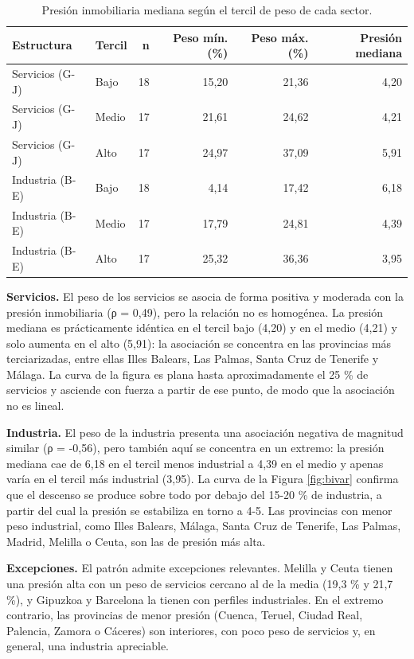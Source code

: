 \documentclass[econometrics,article,submit,moreauthors,pdftex]{Definitions/mdpi}
\begin{document}
\begin{table}[H]
\centering
\caption{\label{tab:tabterciles}Presión inmobiliaria mediana según el tercil de peso de cada sector.}
\centering
\fontsize{8}{10}\selectfont
\begin{tabular}[t]{llrrrr}
\toprule
Estructura & Tercil & n & Peso mín. (\%) & Peso máx. (\%) & Presión mediana\\
\midrule
Servicios (G-J) & Bajo & 18 & 15,20 & 21,36 & 4,20\\
Servicios (G-J) & Medio & 17 & 21,61 & 24,62 & 4,21\\
Servicios (G-J) & Alto & 17 & 24,97 & 37,09 & 5,91\\
Industria (B-E) & Bajo & 18 & 4,14 & 17,42 & 6,18\\
Industria (B-E) & Medio & 17 & 17,79 & 24,81 & 4,39\\
\addlinespace
Industria (B-E) & Alto & 17 & 25,32 & 36,36 & 3,95\\
\bottomrule
\end{tabular}
\end{table}

\textbf{Servicios.} El peso de los servicios se asocia de forma positiva
y moderada con la presión inmobiliaria (ρ = 0,49), pero la relación no
es homogénea. La presión mediana es prácticamente idéntica en el tercil
bajo (4,20) y en el medio (4,21) y solo aumenta en el alto (5,91): la
asociación se concentra en las provincias más terciarizadas, entre ellas
Illes Balears, Las Palmas, Santa Cruz de Tenerife y Málaga. La curva de
la figura es plana hasta aproximadamente el 25 \% de servicios y
asciende con fuerza a partir de ese punto, de modo que la asociación no
es lineal.

\textbf{Industria.} El peso de la industria presenta una asociación
negativa de magnitud similar (ρ = -0,56), pero también aquí se concentra
en un extremo: la presión mediana cae de 6,18 en el tercil menos
industrial a 4,39 en el medio y apenas varía en el tercil más industrial
(3,95). La curva de la Figura \ref{fig:bivar} confirma que el descenso
se produce sobre todo por debajo del 15-20 \% de industria, a partir del
cual la presión se estabiliza en torno a 4-5. Las provincias con menor
peso industrial, como Illes Balears, Málaga, Santa Cruz de Tenerife, Las
Palmas, Madrid, Melilla o Ceuta, son las de presión más alta.

\textbf{Excepciones.} El patrón admite excepciones relevantes. Melilla y
Ceuta tienen una presión alta con un peso de servicios cercano al de la
media (19,3 \% y 21,7 \%), y Gipuzkoa y Barcelona la tienen con perfiles
industriales. En el extremo contrario, las provincias de menor presión
(Cuenca, Teruel, Ciudad Real, Palencia, Zamora o Cáceres) son
interiores, con poco peso de servicios y, en general, una industria
apreciable.
\end{document}
